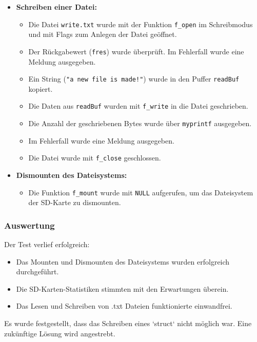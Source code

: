\begin{itemize}
	\item \textbf{Schreiben einer Datei:}
	\begin{itemize}
		\item Die Datei \texttt{write.txt} wurde mit der Funktion \texttt{f\_open} im Schreibmodus und mit Flags zum Anlegen der Datei geöffnet.
		\item Der Rückgabewert (\texttt{fres}) wurde überprüft. Im Fehlerfall wurde eine Meldung ausgegeben.
		\item Ein String (\texttt{"a new file is made!"}) wurde in den Puffer \texttt{readBuf} kopiert.
		\item Die Daten aus \texttt{readBuf} wurden mit \texttt{f\_write} in die Datei geschrieben.
		\item Die Anzahl der geschriebenen Bytes wurde über \texttt{myprintf} ausgegeben.
		\item Im Fehlerfall wurde eine Meldung ausgegeben.
		\item Die Datei wurde mit \texttt{f\_close} geschlossen.
	\end{itemize}
	
	\item \textbf{Dismounten des Dateisystems:}
	\begin{itemize}
		\item Die Funktion \texttt{f\_mount} wurde mit \texttt{NULL} aufgerufen, um das Dateisystem der SD-Karte zu dismounten.
	\end{itemize}
\end{itemize}

\subsubsection{Auswertung}
Der Test verlief erfolgreich:

\begin{itemize}
	\item Das Mounten und Dismounten des Dateisystems wurden erfolgreich durchgeführt.
	\item Die SD-Karten-Statistiken stimmten mit den Erwartungen überein.
	\item Das Lesen und Schreiben von .txt Dateien funktionierte einwandfrei.
\end{itemize}

Es wurde festgestellt, dass das Schreiben eines `struct` nicht möglich war. Eine zukünftige Lösung wird angestrebt.
